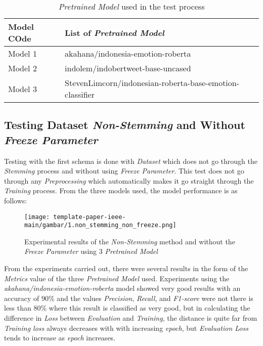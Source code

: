 \begin{table}[!h]
    \caption{\textit{Pretrained Model} used in the test process}
    \label{tab: daftar_model}
    \centering
    \begin{tabular}{|l||l|}
        \hline
       \textbf{Model COde} &\textbf{List of \textit{Pretrained Model}} \\ \hline
        Model 1            &akahana/indonesia-emotion-roberta\\ \hline 
        Model 2            &indolem/indobertweet-base-uncased  \\ \hline
        Model 3            &StevenLimcorn/indonesian-roberta-base-emotion-classifier  \\ \hline 
    \end{tabular}
\end{table}

\subsection{Testing Dataset \textit{Non-Stemming} and Without \textit{Freeze Parameter}}

Testing with the first schema is done with \textit{Dataset} which does not go through the \textit{Stemming} process and without using \textit{Freeze Parameter}. This test does not go through any \textit{Preprocessing} which automatically makes it go straight through the \textit{Training} process. From the three models used, the model performance is as follows:

\begin{figure}[h]
    \begin{center}
        \texttt{[image: template-paper-ieee-main/gambar/1.non\_stemming\_non\_freeze.png]}
        \caption{Experimental results of the \textit{Non-Stemming} method and without the \textit{Freeze Parameter} using 3 \textit{Pretrained Model}}
        \label{fig: bertToken}
    \end{center}
\end{figure}

From the experiments carried out, there were several results in the form of the \textit{Metrics} value of the three \textit{Pretrained Model} used. Experiments using the \textit{akahana/indonesia-emotion-roberta} model showed very good results with an accuracy of 90\% and the values \textit{Precision}, \textit{Recall}, and \textit{F1-score} were not there is less than 80\% where this result is classified as very good, but in calculating the difference in \textit{Loss} between \textit{Evaluation} and \textit{Training}, the distance is quite far from \textit{Training loss} always decreases with with increasing \textit{epoch}, but \textit{Evaluation Loss} tends to increase as \textit{epoch} increases.

